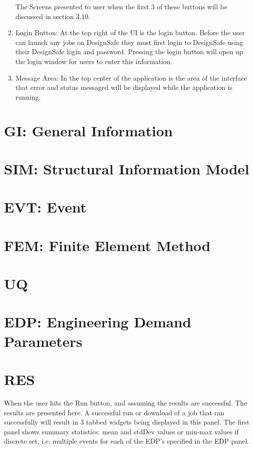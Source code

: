 \begin{enumerate}
The Screens presented to user when the first 3 of these buttons will be discussed in section 3.10.

\item Login Button: At the top right of the UI is the login button. Before the user can launch any jobs on DesignSafe they must first login to DesignSafe using their DesignSafe login and password. Pressing the login button will open up the login window for users to enter this information.

\item Message Area: In the top center of the application is the area of the interface that error and status messaged will be displayed while the application is running.

\end{enumerate}

\section{GI: General Information}


\section{SIM: Structural Information Model}


\section{EVT: Event}


\section{FEM: Finite Element Method}


\section{UQ}


\section{EDP: Engineering Demand Parameters}


\section{RES}

When the user hits the Run button, and assuming the results are successful. The results are presented here.  A successful run or download of a job that ran successfully will result in 3 tabbed widgets being displayed in this panel.  The first panel shows summary statistics: mean and stdDev values or min-max values if discrete set, i.e. multiple events for each of the EDP's specified in the EDP panel.

